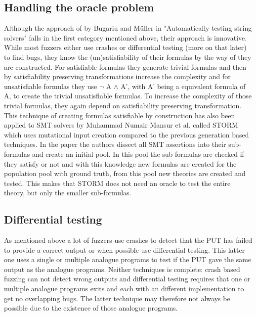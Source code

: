 \subsection{Handling the oracle problem}
\label{cha:2:handelingOracelproblem}
Although the approach of by Bugariu and M\"uller in "Automatically testing string solvers"\cite{9bugariu2020automaticallyTestingStringSolvers} falls in the first category mentioned above, their approach is innovative. While most fuzzers either use crashes or differential testing (more on that later) to find bugs, they know the (un)satisfiability of their formulas by the way of they are constructed. For satisfiable formulas they generate trivial formulas and then by satisfiability preserving transformations increase the complexity and for unsatisfiable formulas they use $\neg$ A $\land$ A', with A' being a equivalent formula of A, to create the trivial unsatisfiable formulas. To increase the complexity of those trivial formulas, they again depend on satisfiability preserving transformation. This technique of creating formulas satisfiable by construction has also been applied to SMT solvers by Muhammad Numair Mansur et al. called STORM\cite{1mansur2020detecting} which uses mutational input creation compared to the previous generation based techniques. In the paper the authors dissect all SMT assertions into their sub-formulas and create an initial pool. In this pool the sub-formulas are checked if they satisfy or not and with this knowledge new formulas are created for the population pool with ground truth, from this pool new theories are created and tested. This makes that STORM does not need an oracle to test the entire theory, but only the smaller sub-formulas.

\subsection{Differential testing}
\label{cha:2:Differential}
As mentioned above a lot of fuzzers use crashes to detect that the PUT has failed to provide a correct output or when possible use differential testing. This latter one uses a single or multiple analogue programs to test if the PUT gave the same output as the analogue programs. Neither techniques is complete: crash based fuzzing can not detect wrong outputs and differential testing requires that one or multiple analogue programs exits and each with an different implementation to get no overlapping bugs. The latter technique may therefore not always be possible due to the existence of those analogue programs.

